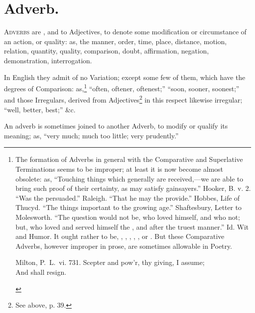 \chapter{Adverb.}

\textsc{Adverbs} are , and to Adjectives, to denote
some modification or circumstance of an action, or quality: as, the
manner, order, time, place, distance, motion, relation, quantity,
quality, comparison, doubt, affirmation, negation, demonstration,
interrogation.

In English they admit of no Variation; except some few of them, which
have the degrees of Comparison: as,\footnote{The formation of Adverbs in
  general with the Comparative and Superlative Terminations seems to be
  improper; at least it is now become almost obsolete: as, ``Touching
  things which generally are received,---we are  able to
  bring such proof of their certainty, as may satisfy gainsayers.''
  Hooker, B. v. 2. ``Was the  persuaded.'' Raleigh. ``That
  he may the  provide.'' Hobbes, Life of Thucyd. ``The
  things  important to the growing age.'' Shaftesbury,
  Letter to Molesworth. ``The question would not be, who loved himself,
  and who not; but, who loved and served himself the , and
  after the truest manner.'' Id. Wit and Humor. It ought rather to be,
  , , , , , or . But these Comparative
  Adverbs, however improper in prose, are sometimes allowable in Poetry.

  \begin{aquote}{Milton, P.\ L.\ vi. 731.}
    Scepter and pow'r, thy giving, I assume;\\
    And  shall resign.
  \end{aquote}} ``often, oftener, oftenest;'' ``soon, sooner, soonest;''
and those Irregulars, derived from Adjectives\footnote{See above, p.
  39.} in this respect likewise irregular; ``well, better, best;'' \&c.

An adverb is sometimes joined to another Adverb, to modify or qualify
its meaning; as, ``very much; much too little; very prudently.''
